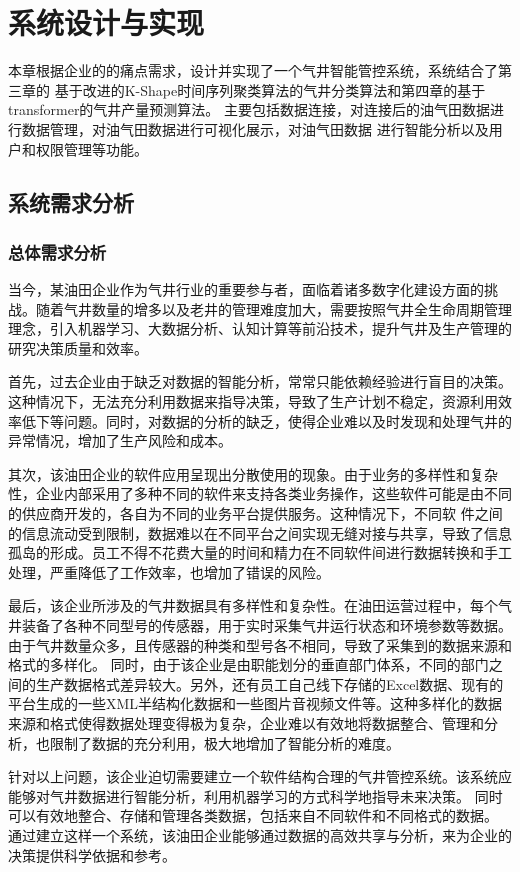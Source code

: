 \chapter{系统设计与实现}
本章根据企业的的痛点需求，设计并实现了一个气井智能管控系统，系统结合了第三章的
基于改进的K-Shape时间序列聚类算法的气井分类算法和第四章的基于transformer的气井产量预测算法。
主要包括数据连接，对连接后的油气田数据进行数据管理，对油气田数据进行可视化展示，对油气田数据
进行智能分析以及用户和权限管理等功能。
\section{系统需求分析}
\subsection{总体需求分析}
当今，某油田企业作为气井行业的重要参与者，面临着诸多数字化建设方面的挑战。随着气井数量的增多以及老井的管理难度加大，需要按照气井全生命周期管理理念，引入机器学习、大数据分析、认知计算等前沿技术，提升气井及生产管理的研究决策质量和效率。

首先，过去企业由于缺乏对数据的智能分析，常常只能依赖经验进行盲目的决策。这种情况下，无法充分利用数据来指导决策，导致了生产计划不稳定，资源利用效率低下等问题。同时，对数据的分析的缺乏，使得企业难以及时发现和处理气井的异常情况，增加了生产风险和成本。

其次，该油田企业的软件应用呈现出分散使用的现象。由于业务的多样性和复杂性，企业内部采用了多种不同的软件来支持各类业务操作，这些软件可能是由不同的供应商开发的，各自为不同的业务平台提供服务。这种情况下，不同软
件之间的信息流动受到限制，数据难以在不同平台之间实现无缝对接与共享，导致了信息孤岛的形成。员工不得不花费大量的时间和精力在不同软件间进行数据转换和手工处理，严重降低了工作效率，也增加了错误的风险。

最后，该企业所涉及的气井数据具有多样性和复杂性。在油田运营过程中，每个气井装备了各种不同型号的传感器，用于实时采集气井运行状态和环境参数等数据。由于气井数量众多，且传感器的种类和型号各不相同，导致了采集到的数据来源和格式的多样化。
同时，由于该企业是由职能划分的垂直部门体系，不同的部门之间的生产数据格式差异较大。另外，还有员工自己线下存储的Excel数据、现有的平台生成的一些XML半结构化数据和一些图片音视频文件等。这种多样化的数据来源和格式使得数据处理变得极为复杂，企业难以有效地将数据整合、管理和分析，也限制了数据的充分利用，极大地增加了智能分析的难度。

针对以上问题，该企业迫切需要建立一个软件结构合理的气井管控系统。该系统应能够对气井数据进行智能分析，利用机器学习的方式科学地指导未来决策。
同时可以有效地整合、存储和管理各类数据，包括来自不同软件和不同格式的数据。
通过建立这样一个系统，该油田企业能够通过数据的高效共享与分析，来为企业的决策提供科学依据和参考。


